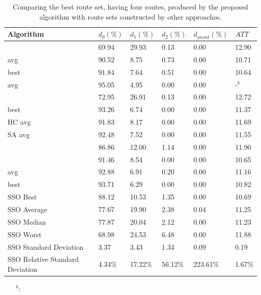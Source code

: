 \begin{table}[H]
	\centering
    \hspace*{-1.0cm}
    \begin{tabular}{|l||l|l|l|l|l|}
 	\hline
 	Algorithm & $d_0(\%)$ & $d_1(\%)$ & $d_2(\%)$ & $d_{unsat}(\%)$ & $ATT$ \\
 	\hline
    \citet{mandl79} & 69.94 & 29.93 & 0.13 & 0.00 & 12.90 \\
    \citet{kechagiopoulos14} avg & 90.52 & 8.75 & 0.73 & 0.00 & 10.71 \\
    \citet{kechagiopoulos14} best & 91.84 & 7.64 & 0.51 & 0.00 & 10.64 \\
    \citet{nikolic14} avg & 95.05 & 4.95 & 0.00 & 0.00 & -$^b$ \\
    \citet{kidwai98} & 72.95 & 26.91 & 0.13 & 0.00 & 12.72 \\
    \citet{fan10} best & 93.26 & 6.74 & 0.00 & 0.00 & 11.37 \\
    \citet{fan10} HC avg & 91.83 & 8.17 & 0.00 & 0.00 & 11.69 \\
    \citet{fan10} SA avg & 92.48 & 7.52 & 0.00 & 0.00 & 11.55 \\
    \citet{chakroborty02} & 86.86 & 12.00 & 1.14 & 0.00 & 11.90 \\
    \citet{zhang10} & 91.46 & 8.54 & 0.00 & 0.00 & 10.65 \\
    \citet{chew12} avg & 92.88 & 6.91 & 0.20 & 0.00 & 11.16 \\
    \citet{chew12} best & 93.71 & 6.29 & 0.00 & 0.00 & 10.82 \\
	\hline
    \hline
    SSO Best & 88.12 & 10.53 & 1.35 & 0.00 & 10.69 \\
    SSO Average & 77.67 & 19.90 & 2.38 & 0.04 & 11.25 \\
    SSO Median & 77.87 & 20.04 & 2.12 & 0.00 & 11.23 \\
    SSO Worst & 68.98 & 24.53 & 6.48 & 0.00 & 11.88 \\
    SSO Standard Deviation & 3.37 & 3.43 & 1.34 & 0.09 & 0.19 \\
    SSO Relative Standard Deviation & 4.34\% & 17.22\% & 56.12\% & 223.61\% & 1.67\% \\
    \hline
    \end{tabular}
    \caption {Comparing the best route set, having four routes, produced by the proposed algorithm with route sets constructed by other approaches.}
    \begin{itemize}[noitemsep]
    \item[$^b$:] 
    \end{itemize}
    \label{table:performanceComparison_4}
\end{table}


